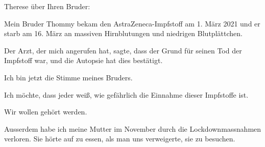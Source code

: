 Therese über Ihren Bruder:

Mein Bruder Thommy bekam den AstraZeneca-Impfstoff am 1. März 2021 und er starb
am 16. März an massiven Hirnblutungen und niedrigen Blutplättchen.

Der Arzt, der mich angerufen hat, sagte, dass der Grund für seinen Tod der
Impfstoff war, und die Autopsie hat dies bestätigt.

Ich bin jetzt die Stimme meines Bruders.

Ich möchte, dass jeder weiß, wie gefährlich die Einnahme dieser Impfstoffe ist.

Wir wollen gehört werden.

Ausserdem habe ich meine Mutter im November durch die Lockdownmassnahmen
verloren. Sie hörte auf zu essen, als man uns verweigerte, sie zu besuchen.
